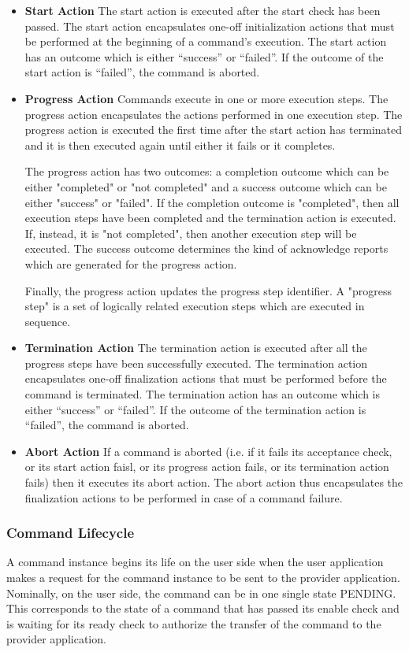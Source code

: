 \begin{itemize}
\item \textbf{Start Action}
The start action is executed after the start check has been passed. The start action encapsulates one-off initialization actions that must be performed at the beginning of a command's execution. 
The start action has an outcome which is either “success” or “failed”. If the outcome of the start action is “failed”, the command is aborted. 
\item \textbf{Progress Action}
Commands execute in one or more execution steps. The progress action encapsulates the actions performed in one execution step. The progress action is executed the first time after the start action has terminated and it is then executed again until either it fails or it completes.
 
The progress action has two outcomes: a completion outcome which can be either "completed" or "not completed" and a success outcome which can be either "success" or "failed". If the completion outcome is "completed", then all execution steps have been completed and the termination action is executed. If, instead, it is "not completed", then another execution step will be executed. The success outcome determines the kind of acknowledge reports which are generated for the progress action. 

Finally, the progress action updates the progress step identifier. A "progress step" is a set of logically related execution steps which are executed in sequence.
\item \textbf{Termination Action}
The termination action is executed after all the progress steps have been successfully executed. The termination action encapsulates one-off finalization actions that must be performed before the command is terminated.
The termination action has an outcome which is either “success” or “failed”. If the outcome of the termination action is “failed”, the command is aborted. 
\item \textbf{Abort Action}
If a command is aborted (i.e. if it fails its acceptance check, or its start action faisl, or its progress action fails, or its termination action fails) then it executes its abort action. The abort action thus encapsulates the finalization actions to be performed in case of a command failure. 
\end{itemize}

\subsubsection{Command Lifecycle}\label{sec:CmdLifecycle}
A command instance begins its life on the user side when the user application makes a request for the command instance to be sent to the provider application. Nominally, on the user side, the command can be in one single state PENDING. This corresponds to the state of a command that has passed its enable check and is waiting for its ready check to authorize the transfer of the command to the provider application. 

